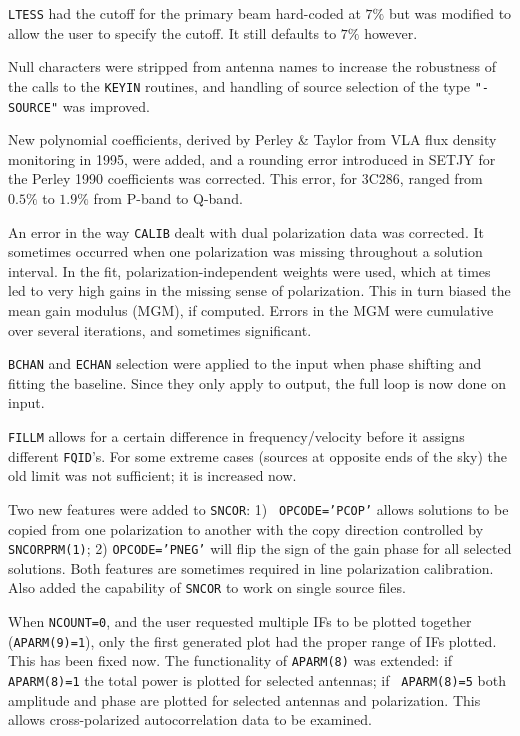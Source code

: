 \begin{description}

 {\tt LTESS} had the cutoff for the primary beam
hard-coded at $7\%$ but was modified to allow the user to
specify the cutoff. It still defaults to $7\%$ however.

 Null characters were stripped from antenna names to
increase the robustness of the calls to the {\tt KEYIN} routines, and
handling of source selection of the type {\tt "-SOURCE"} was improved.

 New polynomial coefficients, derived by Perley \&
Taylor from VLA flux density monitoring in 1995, were added, and a
rounding error introduced in SETJY for the Perley 1990 coefficients
was corrected. This error, for 3C286, ranged from $0.5\%$ to $1.9\%$
from P-band to Q-band.

 An error in the way {\tt CALIB} dealt with dual
polarization data was corrected. It sometimes occurred when one
polarization was missing throughout a solution interval. In the fit,
polarization-independent weights were used, which at times led to very
high gains in the missing sense of polarization. This in turn biased
the mean gain modulus (MGM), if computed. Errors in the MGM were
cumulative over several iterations, and sometimes significant.

 {\tt BCHAN} and {\tt ECHAN} selection were applied to the
input when phase shifting and fitting the baseline.  Since they only
apply to output, the full loop is now done on input.

 {\tt FILLM} allows for a certain difference in
frequency/velocity before it assigns different {\tt FQID}'s. For some
extreme cases (sources at opposite ends of the sky) the old limit was
not sufficient; it is increased now.

 Two new features were added to {\tt SNCOR}: 1) {\tt
OPCODE='PCOP'} allows solutions to be copied from one polarization to
another with the copy direction controlled by {\tt SNCORPRM(1)}; 2)
{\tt OPCODE='PNEG'} will flip the sign of the gain phase for all
selected solutions.  Both features are sometimes required in line
polarization calibration. Also added the capability of {\tt SNCOR} to
work on single source files.

 When {\tt NCOUNT=0}, and the user requested
multiple IFs to be plotted together ({\tt APARM(9)=1}), only the first
generated plot had the proper range of IFs plotted. This has been
fixed now. The functionality of {\tt APARM(8)} was extended: if {\tt
APARM(8)=1} the total power is plotted for selected antennas; if {\tt
APARM(8)=5} both amplitude and phase are plotted for selected antennas
and polarization. This allows cross-polarized autocorrelation data to
be examined.


\end{description}
